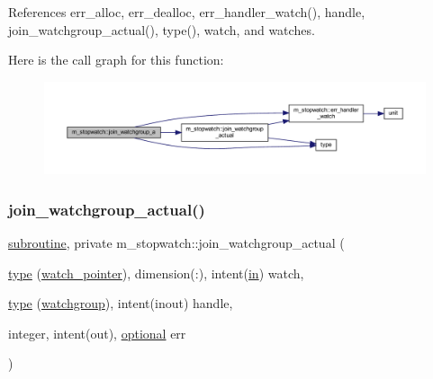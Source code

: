 References err\+\_\+alloc, err\+\_\+dealloc, err\+\_\+handler\+\_\+watch(), handle, join\+\_\+watchgroup\+\_\+actual(), type(), watch, and watches.

Here is the call graph for this function\+:
\nopagebreak
\begin{figure}[H]
\begin{center}
\leavevmode
\includegraphics[width=350pt]{namespacem__stopwatch_ac991d5dc751a278faf62f78863b88330_cgraph}
\end{center}
\end{figure}
\mbox{\label{namespacem__stopwatch_ab39cca0de1fcfb5edb0991449b59a48b}} 
\subsubsection{\texorpdfstring{join\+\_\+watchgroup\+\_\+actual()}{join\_watchgroup\_actual()}}
{\footnotesize\ttfamily \hyperlink{M__stopwatch_83_8txt_acfbcff50169d691ff02d4a123ed70482}{subroutine}, private m\+\_\+stopwatch\+::join\+\_\+watchgroup\+\_\+actual (\begin{DoxyParamCaption}\item[{\hyperlink{stop__watch_83_8txt_a70f0ead91c32e25323c03265aa302c1c}{type} (\hyperlink{structm__stopwatch_1_1watch__pointer}{watch\+\_\+pointer}), dimension(\+:), intent(\hyperlink{M__journal_83_8txt_afce72651d1eed785a2132bee863b2f38}{in})}]{watch,  }\item[{\hyperlink{stop__watch_83_8txt_a70f0ead91c32e25323c03265aa302c1c}{type} (\hyperlink{structm__stopwatch_1_1watchgroup}{watchgroup}), intent(inout)}]{handle,  }\item[{integer, intent(out), \hyperlink{option__stopwatch_83_8txt_aa4ece75e7acf58a4843f70fe18c3ade5}{optional}}]{err }\end{DoxyParamCaption})\hspace{0.3cm}{\ttfamily [private]}}



